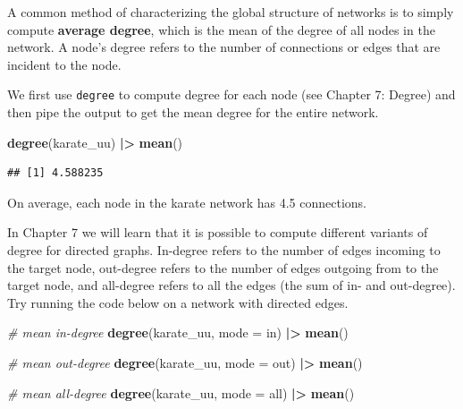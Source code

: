 \documentclass[
]{book}
\newenvironment{Shaded}{\begin{snugshade}}{\end{snugshade}}
\newcommand{\AttributeTok}[1]{\textcolor[rgb]{0.13,0.29,0.53}{#1}}
\newcommand{\CommentTok}[1]{\textcolor[rgb]{0.56,0.35,0.01}{\textit{#1}}}
\newcommand{\FunctionTok}[1]{\textcolor[rgb]{0.13,0.29,0.53}{\textbf{#1}}}
\newcommand{\NormalTok}[1]{#1}
\newcommand{\SpecialCharTok}[1]{\textcolor[rgb]{0.81,0.36,0.00}{\textbf{#1}}}
\newcommand{\StringTok}[1]{\textcolor[rgb]{0.31,0.60,0.02}{#1}}
\begin{document}
A common method of characterizing the global structure of networks is to simply compute \textbf{average degree}, which is the mean of the degree of all nodes in the network. A node's degree refers to the number of connections or edges that are incident to the node.

We first use \texttt{degree} to compute degree for each node (see Chapter 7: Degree) and then pipe the output to get the mean degree for the entire network.

\begin{Shaded}
\begin{Highlighting}[]
\FunctionTok{degree}\NormalTok{(karate\_uu) }\SpecialCharTok{|\textgreater{}} \FunctionTok{mean}\NormalTok{()}
\end{Highlighting}
\end{Shaded}

\begin{verbatim}
## [1] 4.588235
\end{verbatim}

On average, each node in the karate network has 4.5 connections.

In Chapter 7 we will learn that it is possible to compute different variants of degree for directed graphs. In-degree refers to the number of edges incoming to the target node, out-degree refers to the number of edges outgoing from to the target node, and all-degree refers to all the edges (the sum of in- and out-degree). Try running the code below on a network with directed edges.

\begin{Shaded}
\begin{Highlighting}[]
\CommentTok{\# mean in{-}degree}
\FunctionTok{degree}\NormalTok{(karate\_uu, }\AttributeTok{mode =} \StringTok{\textquotesingle{}in\textquotesingle{}}\NormalTok{) }\SpecialCharTok{|\textgreater{}} \FunctionTok{mean}\NormalTok{()}

\CommentTok{\# mean out{-}degree}
\FunctionTok{degree}\NormalTok{(karate\_uu, }\AttributeTok{mode =} \StringTok{\textquotesingle{}out\textquotesingle{}}\NormalTok{) }\SpecialCharTok{|\textgreater{}} \FunctionTok{mean}\NormalTok{()}

\CommentTok{\# mean all{-}degree}
\FunctionTok{degree}\NormalTok{(karate\_uu, }\AttributeTok{mode =} \StringTok{\textquotesingle{}all\textquotesingle{}}\NormalTok{) }\SpecialCharTok{|\textgreater{}} \FunctionTok{mean}\NormalTok{()}
\end{Highlighting}
\end{Shaded}
\end{document}
